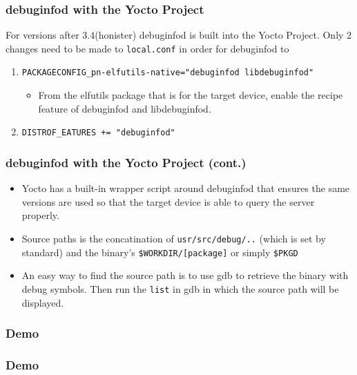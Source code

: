 \documentclass[12pt]{beamer}
\begin{document}
\begin{frame}[fragile]
   \frametitle{debuginfod with the Yocto Project}
   For versions after 3.4(honister) debuginfod is built into the Yocto Project. Only 2 
   changes need to be made to \color{gray} \verb|local.conf| \color{black} in order for debuginfod
   to 
   \begin{enumerate}
      \color{gray}
      \fontsize{10pt}{10pt}\selectfont
      \item \verb|PACKAGECONFIG_pn-elfutils-native="debuginfod libdebuginfod"|
         \begin{itemize}
            \item From the elfutils package that is for the target device, enable the recipe feature of
               debuginfod and libdebuginfod.
         \end{itemize}
      \item \verb|DISTROF_EATURES += "debuginfod"|
   \end{enumerate}
\end{frame}

\begin{frame}[fragile]
   \frametitle{debuginfod with the Yocto Project (cont.)}
   \begin{itemize}
      \item Yocto has a built-in wrapper script around debuginfod that ensures the same versions are used so
        that the target device is able to query the server properly.
      \item Source paths is the concatination of \color{gray} \verb|usr/src/debug/..| \color{black} (which is
         set by standard) and the binary's \color{gray} \verb|$WORKDIR/[package]|\color{black} or simply
         \color{gray} \verb|$PKGD|
         \color{black}
      \item An easy way to find the source path is to use gdb to retrieve the binary with debug symbols. 
         Then run the \color{gray}\verb|list| \color{black} in gdb in which the source path will be displayed.
   \end{itemize}
\end{frame}




\begin{frame}
   \frametitle{ Demo}
\end{frame}

\begin{frame}
   \frametitle{ Demo}
\end{frame}
\end{document}
